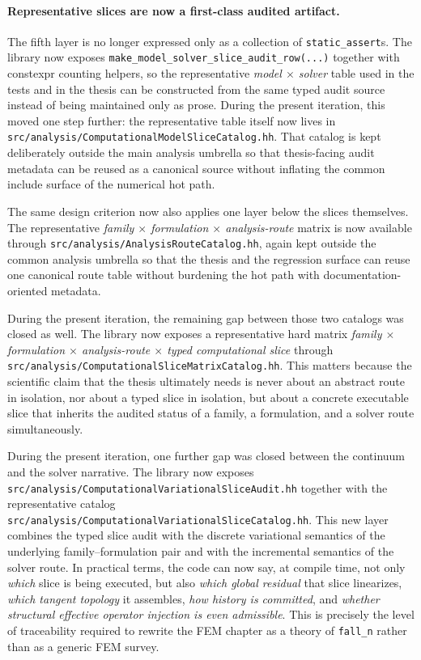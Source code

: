 \paragraph{Representative slices are now a first-class audited artifact.}
The fifth layer is no longer expressed only as a collection of
\texttt{static\_assert}s.  The library now exposes
\texttt{make\_model\_solver\_slice\_audit\_row(...)} together with constexpr
counting helpers, so the representative
\emph{model $\times$ solver} table used in the tests and in the thesis can be
constructed from the same typed audit source instead of being maintained only
as prose.
During the present iteration, this moved one step further: the representative
table itself now lives in
\texttt{src/analysis/ComputationalModelSliceCatalog.hh}.  That catalog is kept
deliberately outside the main analysis umbrella so that thesis-facing audit
metadata can be reused as a canonical source without inflating the common
include surface of the numerical hot path.

The same design criterion now also applies one layer below the slices
themselves.  The representative
\emph{family $\times$ formulation $\times$ analysis-route} matrix is now
available through \texttt{src/analysis/AnalysisRouteCatalog.hh}, again kept
outside the common analysis umbrella so that the thesis and the regression
surface can reuse one canonical route table without burdening the hot path
with documentation-oriented metadata.

During the present iteration, the remaining gap between those two catalogs was
closed as well.  The library now exposes a representative hard matrix
\emph{family $\times$ formulation $\times$ analysis-route $\times$ typed
computational slice} through
\texttt{src/analysis/ComputationalSliceMatrixCatalog.hh}.  This matters because
the scientific claim that the thesis ultimately needs is never about an
abstract route in isolation, nor about a typed slice in isolation, but about a
concrete executable slice that inherits the audited status of a family, a
formulation, and a solver route simultaneously.

During the present iteration, one further gap was closed between the continuum
and the solver narrative.  The library now exposes
\texttt{src/analysis/ComputationalVariationalSliceAudit.hh} together with the
representative catalog
\texttt{src/analysis/ComputationalVariationalSliceCatalog.hh}.  This new layer
combines the typed slice audit with the discrete variational semantics of the
underlying family--formulation pair and with the incremental semantics of the
solver route.  In practical terms, the code can now say, at compile time, not
only \emph{which} slice is being executed, but also \emph{which global
residual} that slice linearizes, \emph{which tangent topology} it assembles,
\emph{how history is committed}, and \emph{whether structural effective
operator injection is even admissible}.  This is precisely the level of
traceability required to rewrite the FEM chapter as a theory of
\texttt{fall\_n} rather than as a generic FEM survey.

